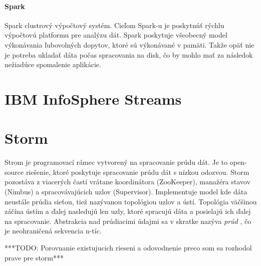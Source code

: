 \paragraph{Spark}
Spark \citep{Spark} clustrový výpočtový systém. Cieľom Spark-u je poskytnúť rýchlu výpočtovú platformu pre analýzu dát. Spark poskytuje všeobecný model výkonávania ľubovolných dopytov, ktoré sú výkonávané v pamäti. Takže opäť nie je potreba ukladať dáta počas spracovania na disk, čo by mohlo mať za následok nežiadúce spomalenie aplikácie. 

\section{IBM InfoSphere Streams}

\section{Storm}
Strom je programovací rámec vytvorený na spracovanie prúdu dát. Je to open-source riešenie, ktoré poskytuje spracovanie prúdu dát s nízkou odozvou. Storm pozostáva z viacerých častí vrátane koordinátora (ZooKeeper), manažéra stavov (Nimbus) a spracovávajúcich uzlov (Supervisor). Implementuje model kde dáta neustále prúdia sieťou, tiež nazývanou topológiou uzlov a ústí. Topológia väčšinou záčína ústím a ďalej nasledujú len uzly, ktoré spracujú dáta a posielajú ich ďalej na spracovanie. Abstrakcia nad prúdiacimi údajmi sa v skratke nazýva \textit{prúd} \citep{liu2014survey}, čo je neohraničená sekvencia n-tíc.


\begin{shaded}
***TODO: Porovnanie existujucich rieseni a odovodnenie preco som sa rozhodol prave pre storm***
\end{shaded}

